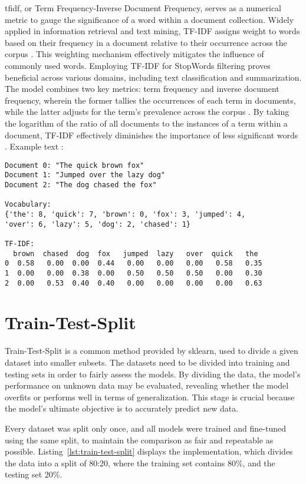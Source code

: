 \ac{tfidf}, or Term Frequency-Inverse Document Frequency, serves as a numerical metric to gauge the significance of a word within a document collection. Widely applied in information retrieval and text mining, TF-IDF assigns weight to words based on their frequency in a document relative to their occurrence across the corpus \citep{vijayarani_preprocessing_2015}. This weighting mechanism effectively mitigates the influence of commonly used words. Employing TF-IDF for StopWords filtering proves beneficial across various domains, including text classification and summarization. The model combines two key metrics: term frequency and inverse document frequency, wherein the former tallies the occurrences of each term in documents, while the latter adjusts for the term's prevalence across the corpus \citep{vijayarani_preprocessing_2015}. By taking the logarithm of the ratio of all documents to the instances of a term within a document, TF-IDF effectively diminishes the importance of less significant words \citep{tabassum_survey_2020}. Example text \citep{openai_gpt3}: 

\begin{verbatim}
Document 0: "The quick brown fox"
Document 1: "Jumped over the lazy dog"
Document 2: "The dog chased the fox"

Vocabulary: 
{'the': 8, 'quick': 7, 'brown': 0, 'fox': 3, 'jumped': 4,
'over': 6, 'lazy': 5, 'dog': 2, 'chased': 1}

TF-IDF:
  brown  chased  dog  fox   jumped  lazy   over  quick   the 
0  0.58   0.00  0.00  0.44   0.00   0.00   0.00   0.58   0.35  
1  0.00   0.00  0.38  0.00   0.50   0.50   0.50   0.00   0.30  
2  0.00   0.53  0.40  0.40   0.00   0.00   0.00   0.00   0.63   
\end{verbatim}

\section{Train-Test-Split}

Train-Test-Split is a common method provided by sklearn, used to divide a given dataset into smaller subsets. The datasets need to be divided into training and testing sets in order to fairly assess the models. By dividing the data, the model's performance on unknown data may be evaluated, revealing whether the model overfits or performs well in terms of generalization. This stage is crucial because the model's ultimate objective is to accurately predict new data.

Every dataset was split only once, and all models were trained and fine-tuned using the same split, to maintain the comparison as fair and repeatable as possible. Listing~\ref{lst:train-test-split} displays the implementation, which divides the data into a split of 80:20, where the training set contains 80\%, and the testing set 20\%. 


